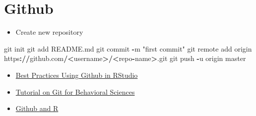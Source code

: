 \documentclass[]{book}
\newenvironment{Shaded}{\begin{snugshade}}{\end{snugshade}}
\newcommand{\ErrorTok}[1]{\textcolor[rgb]{0.64,0.00,0.00}{\textbf{#1}}}
\newcommand{\NormalTok}[1]{#1}
\newcommand{\OperatorTok}[1]{\textcolor[rgb]{0.81,0.36,0.00}{\textbf{#1}}}
\newcommand{\StringTok}[1]{\textcolor[rgb]{0.31,0.60,0.02}{#1}}
\providecommand{\tightlist}{%
  \setlength{\itemsep}{0pt}\setlength{\parskip}{0pt}}
\begin{document}
\hypertarget{github}{%
\section{Github}\label{github}}

\begin{itemize}
\tightlist
\item
  Create new repository
\end{itemize}

\begin{Shaded}
\begin{Highlighting}[]
\NormalTok{git init}
\NormalTok{git add README.md}
\NormalTok{git commit }\OperatorTok{-}\NormalTok{m }\StringTok{"first commit"}
\NormalTok{git remote add origin https}\OperatorTok{:}\ErrorTok{//}\NormalTok{github.com}\OperatorTok{/}\ErrorTok{<}\NormalTok{username}\OperatorTok{>}\ErrorTok{/<}\NormalTok{repo}\OperatorTok{-}\NormalTok{name}\OperatorTok{>}\NormalTok{.git}
\NormalTok{git push }\OperatorTok{-}\NormalTok{u origin master}
\end{Highlighting}
\end{Shaded}

\begin{itemize}
\item
  \href{http://r-pkgs.had.co.nz/git.html}{Best Practices Using Github in RStudio}
\item
  \href{https://vuorre.netlify.com/pdf/2017-Vuorre-Curley.pdf}{Tutorial on Git for Behavioral Sciences}
\item
  \href{https://happygitwithr.com/}{Github and R}
\end{itemize}


\end{document}
